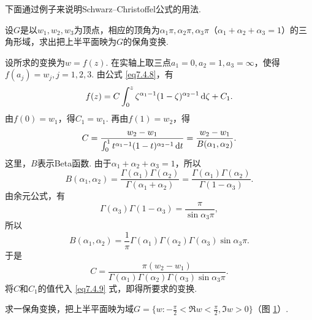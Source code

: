 下面通过例子来说明Schwarz--Christoffel公式的用法.
\begin{example}\label{thm7.4.7}
  设$G$是以$w_1,w_2,w_3$为顶点，相应的顶角为$\alpha_1\pi,\alpha_2\pi,\alpha_3\pi$（$\alpha_1+\alpha_2+\alpha_3=1$）的三角形域，求出把上半平面映为$G$的保角变换.
\end{example}
\begin{solution}
  设所求的变换为$w=f(z)$. 在实轴上取三点$a_1=0,a_2=1,a_3=\infty$，使得$f(a_j)=w_j,j=1,2,3$. 由公式 \eqref{eq7.4.8}，有
  \begin{equation}\label{eq7.4.9}
    f(z) = C\int_0^z\zeta^{\alpha_1-1}(1-\zeta)^{\alpha_2-1}\mathop{}\!\mathrm{d} \zeta+C_1.
  \end{equation}
  由$f(0)=w_1$，得$C_1=w_1$. 再由$f(1)=w_2$，得
  \[
    C = \frac{w_2-w_1}{\int_0^1t^{\alpha_1-1}(1-t)^{\alpha_2-1}\mathop{}\!\mathrm{d} t}
    = \frac{w_2-w_1}{B(\alpha_1,\alpha_2)}.
  \]
  这里，$B$表示Beta函数. 由于$\alpha_1+\alpha_2+\alpha_3=1$，所以
  \[
    B(\alpha_1,\alpha_2) = \frac{\Gamma(\alpha_1)\Gamma(\alpha_2)}{\Gamma(\alpha_1+\alpha_2)}
    = \frac{\Gamma(\alpha_1)\Gamma(\alpha_2)}{\Gamma(1-\alpha_3)}.
  \]
  由余元公式，有
  \[
    \Gamma(\alpha_3)\Gamma(1-\alpha_3) = \frac\pi{\sin\alpha_3\pi},
  \]
  所以
  \[
    B(\alpha_1,\alpha_2) = \frac1\pi\Gamma(\alpha_1)\Gamma(\alpha_2)
    \Gamma(\alpha_3)\sin\alpha_3\pi.
  \]
  于是
  \[
     C = \frac{\pi(w_2-w_1)}{\Gamma(\alpha_1)\Gamma(\alpha_2)
    \Gamma(\alpha_3)\sin\alpha_3\pi}.
  \]
  将$C$和$C_1$的值代入 \eqref{eq7.4.9} 式，即得所要求的变换.
\end{solution}

\begin{example}\label{exam7.4.8}
  求一保角变换，把上半平面映为域$G=\bigg\{w:-\frac\pi2<\Re w<\frac\pi2,\Im w>0\bigg\}$（图 \ref{fig7.8}）.
\end{example}
\begin{figure}[!ht]
  \centering
  \caption{\label{fig7.8}}
\end{figure}

